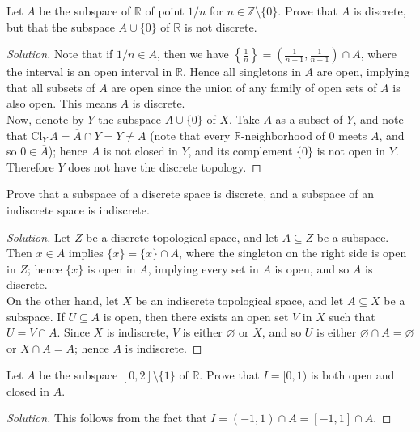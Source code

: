 \documentclass[12pt]{article}
\newenvironment{problem}[2][Problem]{\begin{trivlist}
\item[\hskip \labelsep {\bfseries #1}\hskip \labelsep {\bfseries #2.}]}{\end{trivlist}}
\newcommand{\Cl}[2]{\text{Cl}_{#1}\,#2}
\newenvironment{solution}
  {\renewcommand\qedsymbol{$\blacksquare$}\begin{proof}[Solution]}
{\end{proof}}
\begin{document}
\begin{problem}{3}
  Let $A$ be the subspace of $\mathbb{R}$ of point $1/n$ for 
  $n\in\mathbb{Z}\setminus\{0\}$.
  Prove that $A$ is discrete, but that the subspace $A\cup\{0\}$ of
  $\mathbb{R}$ is not discrete.
\end{problem}
\begin{solution}
  Note that if $1/n\in A$, then we have 
  $\displaystyle{\left\{\frac{1}{n}\right\}=\left(\frac{1}{n+1}, \frac{1}{n-1}\right)\cap A}$, where the interval
  is an open interval in $\mathbb{R}$.
  Hence all singletons in $A$ are open, implying that all subsets of $A$
  are open since the union of any family of open sets of $A$ is also open.
  This means $A$ is discrete.\\
  \indent Now, denote by $Y$ the subspace $A\cup\{0\}$ of $X$.
  Take $A$ as a subset of $Y$, and note that 
  $\Cl{Y}{A}=\overline{A}\cap Y = Y\neq A$ (note that every 
  $\mathbb{R}$-neighborhood of $0$ meets $A$, and so $0\in\overline{A}$);
  hence $A$ is not closed in $Y$, and its complement $\{0\}$ is not
  open in $Y$.
  Therefore $Y$ does not have the discrete topology.
\end{solution}

\begin{problem}{4}
  Prove that a subspace of a discrete space is discrete, and a subspace of an indiscrete space is indiscrete.
\end{problem}
\begin{solution}
  Let $Z$ be a discrete topological space, and let $A\subseteq Z$ 
  be a subspace.
  Then $x\in A$ implies $\{x\}=\{x\}\cap A$, where the singleton on the right
  side is open in $Z$; hence $\{x\}$ is open in $A$, implying every set in
  $A$ is open, and so $A$ is discrete.\\
  \indent On the other hand, let $X$ be an indiscrete topological space,
  and let $A\subseteq X$ be a subspace. 
  If $U\subseteq A$ is open, then there exists an open set $V$ in $X$
  such that $U=V\cap A$.
  Since $X$ is indiscrete, $V$ is either $\varnothing$ or $X$, and so
  $U$ is either $\varnothing\cap A=\varnothing$ or $X\cap A=A$;
  hence $A$ is indiscrete.
\end{solution}
  
\begin{problem}{5}
  Let $A$ be the subspace $[0,2]\setminus\{1\}$ of $\mathbb{R}$.
  Prove that $I=[0,1)$ is both open and closed in $A$.
\end{problem}
\begin{solution}
  This follows from the fact that $I=(-1, 1)\cap A=[-1,1]\cap A$. 
\end{solution}
\end{document}
